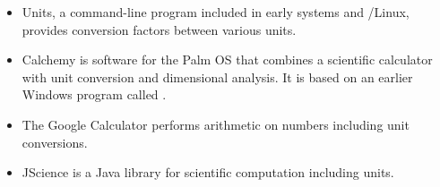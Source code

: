 \begin{itemize}

\item Units\cite{units}, a command-line program included in early
 systems and /Linux, provides conversion factors
between various units.

\item Calchemy\cite{calchemy} is software for the Palm OS that combines a
scientific calculator with unit conversion and dimensional analysis.
It is based on an earlier Windows program called .

\item The Google Calculator\cite{gcalc} performs arithmetic on numbers
including unit conversions.

\item JScience\cite{jscience} is a Java library for scientific computation
including units.

\end{itemize}
